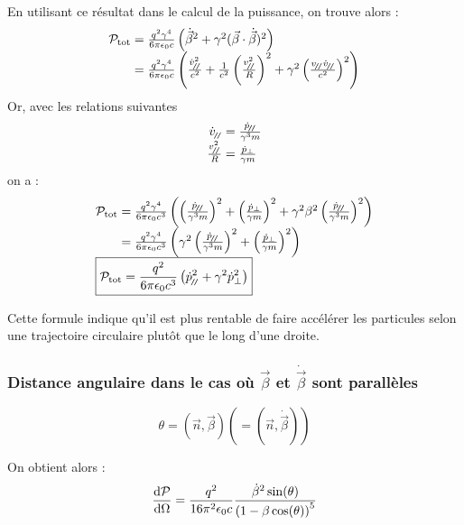 \begin{remark}
En utilisant ce résultat dans le calcul de la puissance, on trouve alors :
$$
	\begin{array}{r@{\;}l}
		\mathcal{P}_\text{tot}&=
			\frac{q^2\gamma^4}{6\pi\epsilon_0c}\left(\dot{\vec{\beta}}^2
			+\gamma^2(\vec{\beta}\cdot\dot{\vec{\beta}})^2\right)\\
		&=\frac{q^2\gamma^4}{6\pi\epsilon_0c}\left(\frac{\dot{v}_{\para}^2}{c^2}+\frac{1}{c^2}\left(\frac{v_{\para}^2}{R}\right)^2
			+\gamma^2\left(\frac{v_{\para}\dot{v}_{\para}}{c^2}\right)^2\right)
	\end{array}
$$
Or, avec les relations suivantes
$$
	\begin{array}{r@{\;}l}
		\dot{v}_{\para}&=\frac{\dot{p}_{\para}}{\gamma^3m}\\
		\frac{v_{\para}^2}{R}&=\frac{\dot{p}_{\perp}}{\gamma m}
	\end{array}
$$
on a :
$$
	\begin{array}{r@{\;}l}
		\mathcal{P}_\text{tot}&=\frac{q^2\gamma^4}{6\pi\epsilon_0c^3}\left(
			\left(\frac{\dot{p}_{\para}}{\gamma^3m}\right)^2
			+\left(\frac{\dot{p}_{\perp}}{\gamma m}\right)^2
			+\gamma^2\beta^2\left(\frac{\dot{p}_{\para}}{\gamma^3m}\right)^2\right)\\
		&=\frac{q^2\gamma^4}{6\pi\epsilon_0c^3}\left(
			\gamma^2\left(\frac{\dot{p}_{\para}}{\gamma^3m}\right)^2
			+\left(\frac{\dot{p}_{\perp}}{\gamma m}\right)^2\right)\\
		\multicolumn{2}{l}{\boxed{\mathcal{P}_\text{tot}=\frac{q^2}{6\pi\epsilon_0c^3}\left(\dot{p}_{\para}^2+\gamma^2\dot{p}_{\perp}^2\right)}}
	\end{array}
$$

Cette formule indique qu'il est plus rentable de faire accélérer les particules selon une trajectoire circulaire plutôt que le long d'une droite.
\end{remark}

\subsubsection*{Distance angulaire dans le cas où $\vec{\beta}$ et $\dot{\vec{\beta}}$ sont parallèles}
$$
	\theta=(\vec{n},\vec{\beta}) (=(\vec{n},\dot{\vec{\beta}}))
$$

On obtient alors :
$$
	\frac{\mathrm{d}\mathcal{P}}{\mathrm{d}\Omega}=\frac{q^2}{16\pi^2\epsilon_0c}\frac{\dot{\beta}^2\sin(\theta)}{\left(1-\beta\cos(\theta)\right)^5}
$$

